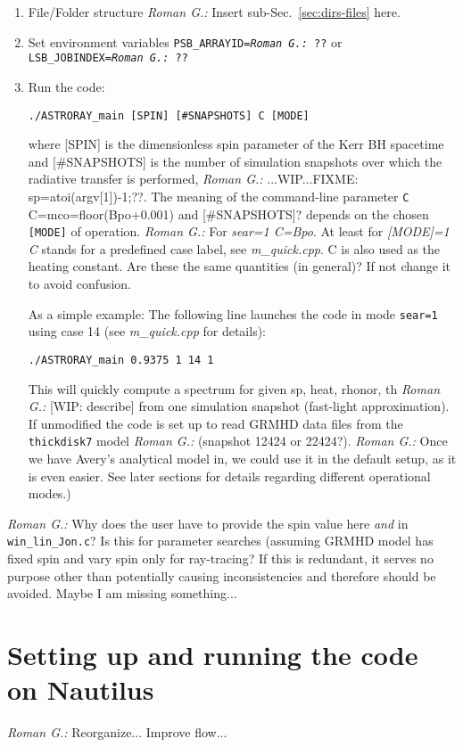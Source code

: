 \documentclass{emulateapj}
\newcommand{\rg}[1]{\color{blue}\textit{Roman G.:} #1\color{black}}
\begin{document}
\begin{enumerate}
  \item File/Folder structure
    \rg{Insert sub-Sec.~\ref{sec:dirs-files} here.}
  \item Set environment variables {\tt PSB\_ARRAYID=\rg{??}} or {\tt
    LSB\_JOBINDEX=\rg{??}}
  \item Run the code:
\begin{verbatim}
./ASTRORAY_main [SPIN] [#SNAPSHOTS] C [MODE]
\end{verbatim}
    where [SPIN] is the dimensionless spin parameter of the Kerr BH
    spacetime and [\#SNAPSHOTS] is the number of simulation snapshots
    over which the radiative transfer is performed,
    \rg{...WIP...FIXME: sp=atoi(argv[1])-1;??}. The meaning of the
    command-line parameter {\tt C} C=mco=floor(Bpo+0.001) and
    [\#SNAPSHOTS]? depends on the chosen {\tt [MODE]} of
    operation. \rg{For \textit{sear=1 C=Bpo}. At least for \textit{[MODE]=1 C} stands for a predefined case label, see \textit{m\_quick.cpp}. C is also used as the
      heating constant. Are these the same quantities (in general)? If
      not change it to avoid confusion.}

    As a simple example: The following line launches the code in mode
    {\tt sear=1} using case 14 (see \textit{m\_quick.cpp} for details):
\begin{verbatim}
./ASTRORAY_main 0.9375 1 14 1
\end{verbatim}
    This will quickly compute a spectrum for given sp, heat, rhonor,
    th \rg{[WIP: describe]} from one simulation snapshot (fast-light
    approximation). If unmodified the code is set up to read GRMHD
    data files from the {\tt thickdisk7} model \rg{(snapshot 12424 or
      22424?)}. \rg{Once we have Avery's analytical model in, we could
      use it in the default setup, as it is even easier}. See later
    sections for details regarding different operational modes.)
\end{enumerate}
\rg{Why does the user have to provide the spin value here \emph{and}
  in {\tt win\_lin\_Jon.c}? Is this for parameter searches (assuming
  GRMHD model has fixed spin and vary spin only for ray-tracing? If
  this is redundant, it serves no purpose other than potentially
  causing inconsistencies and therefore should be avoided. Maybe I am
  missing something...}

\section{Setting up and running the code on Nautilus}
\rg{Reorganize... Improve flow...}
\end{document}
